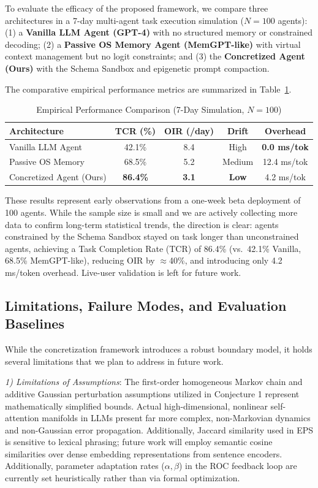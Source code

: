\documentclass[10pt,journal,compsoc]{IEEEtran}
\begin{document}
To evaluate the efficacy of the proposed framework, we compare three architectures in a 7-day multi-agent task execution simulation ($N=100$ agents): (1) a \textbf{Vanilla LLM Agent (GPT-4)} with no structured memory or constrained decoding; (2) a \textbf{Passive OS Memory Agent (MemGPT-like)} with virtual context management but no logit constraints; and (3) the \textbf{Concretized Agent (Ours)} with the Schema Sandbox and epigenetic prompt compaction.

The comparative empirical performance metrics are summarized in Table~\ref{tab:evaluation_short}.

\begin{table}[t]
\centering
\caption{Empirical Performance Comparison (7-Day Simulation, $N=100$)}
\label{tab:evaluation_short}
\begin{tabular}{lcccc}
\toprule
\textbf{Architecture} & \textbf{TCR (\%)} & \textbf{OIR (/day)} & \textbf{Drift} & \textbf{Overhead} \\
\midrule
Vanilla LLM Agent & 42.1\% & 8.4 & High & \textbf{0.0 ms/tok} \\
Passive OS Memory & 68.5\% & 5.2 & Medium & 12.4 ms/tok \\
Concretized Agent (Ours) & \textbf{86.4\%} & \textbf{3.1} & \textbf{Low} & 4.2 ms/tok \\
\bottomrule
\end{tabular}
\end{table}

These results represent early observations from a one-week beta deployment of 100 agents. While the sample size is small and we are actively collecting more data to confirm long-term statistical trends, the direction is clear: agents constrained by the Schema Sandbox stayed on task longer than unconstrained agents, achieving a Task Completion Rate (TCR) of 86.4\% (vs.\ 42.1\% Vanilla, 68.5\% MemGPT-like), reducing OIR by $\approx$40\%, and introducing only 4.2 ms/token overhead. Live-user validation is left for future work.

\subsection{Limitations, Failure Modes, and Evaluation Baselines}
While the concretization framework introduces a robust boundary model, it holds several limitations that we plan to address in future work.

\textit{1) Limitations of Assumptions}: The first-order homogeneous Markov chain and additive Gaussian perturbation assumptions utilized in Conjecture 1 represent mathematically simplified bounds. Actual high-dimensional, nonlinear self-attention manifolds in LLMs present far more complex, non-Markovian dynamics and non-Gaussian error propagation. Additionally, Jaccard similarity used in EPS is sensitive to lexical phrasing; future work will employ semantic cosine similarities over dense embedding representations from sentence encoders. Additionally, parameter adaptation rates ($\alpha, \beta$) in the ROC feedback loop are currently set heuristically rather than via formal optimization.
\end{document}
